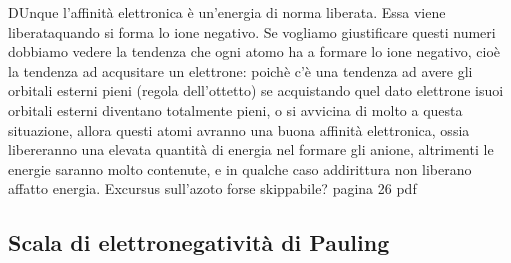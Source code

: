 DUnque l'affinità elettronica è un'energia di norma liberata. Essa viene liberataquando si forma lo ione negativo. Se vogliamo giustificare questi numeri dobbiamo vedere la tendenza che ogni atomo ha a formare lo ione negativo, cioè la tendenza ad acqusitare un elettrone: poichè c'è una tendenza ad avere gli orbitali esterni pieni (regola dell'ottetto)  se acquistando quel dato elettrone isuoi orbitali esterni diventano totalmente pieni, o si avvicina di molto a questa situazione, allora questi atomi avranno una buona affinità elettronica, ossia libereranno una elevata quantità di energia nel formare gli anione, altrimenti le energie saranno molto contenute, e in qualche caso addirittura non liberano affatto energia.
Excursus sull'azoto forse skippabile? pagina 26 pdf
\subsection{Scala di elettronegatività di Pauling}
